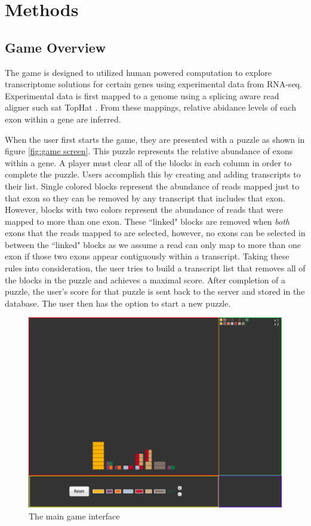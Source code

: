 \documentclass[12pt]{article}
\begin{document}
\section*{Methods}

\subsection*{Game Overview}
The game is designed to utilized human powered computation to explore transcriptome solutions for certain genes using experimental data from
RNA-seq. Experimental data is first mapped to a genome using a splicing aware read aligner such sat TopHat \citep{trapnell2009tophat}. From these mappings,
relative abidance levels of each exon within a gene are inferred.

When the user first starts the game, they are presented with a puzzle as shown in figure \ref{fig:game screen}. This puzzle represents
the relative abundance of exons within a gene. A player must clear all of the blocks in each column in order to complete the puzzle. Users accomplish this by 
creating and adding transcripts to their list. Single colored blocks represent the abundance of reads mapped just to that exon so they can be removed by any 
transcript that includes that exon. However, blocks with two colors represent the abundance of reads that were mapped to more than one exon. These ``linked"
blocks are removed when \emph{both} exons that the reads mapped to are selected, however, no exons can be selected in between the ``linked" blocks as
we assume a read can only map to more than one exon if those two exons appear contiguously within a transcript. Taking these rules into consideration, the user
tries to build a transcript list that removes all of the blocks in the puzzle and achieves a maximal score. After completion of a puzzle, the user's score for that puzzle is
sent back to the server and stored in the database. The user then has the option to start a new puzzle.
\begin{figure}[t]

\centering
\includegraphics[width=5in]{gamescreen}
\caption{The main game interface}
\label{fig:gamescreen}
\end{figure}
\end{document}
